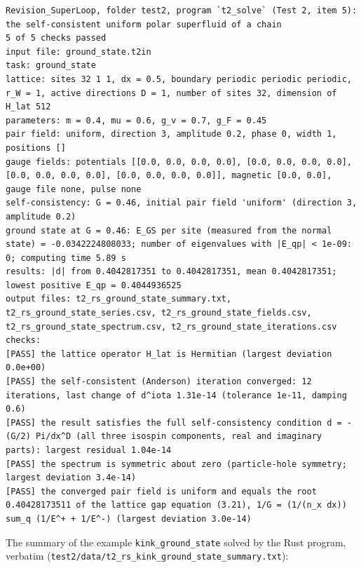 \documentclass[
  10pt,
]{article}
\begin{document}
\begin{verbatim}
Revision_SuperLoop, folder test2, program `t2_solve` (Test 2, item 5): the self-consistent uniform polar superfluid of a chain
5 of 5 checks passed
input file: ground_state.t2in
task: ground_state
lattice: sites 32 1 1, dx = 0.5, boundary periodic periodic periodic, r_W = 1, active directions D = 1, number of sites 32, dimension of H_lat 512
parameters: m = 0.4, mu = 0.6, g_v = 0.7, g_F = 0.45
pair field: uniform, direction 3, amplitude 0.2, phase 0, width 1, positions []
gauge fields: potentials [[0.0, 0.0, 0.0, 0.0], [0.0, 0.0, 0.0, 0.0], [0.0, 0.0, 0.0, 0.0], [0.0, 0.0, 0.0, 0.0]], magnetic [0.0, 0.0], gauge file none, pulse none
self-consistency: G = 0.46, initial pair field 'uniform' (direction 3, amplitude 0.2)
ground state at G = 0.46: E_GS per site (measured from the normal state) = -0.0342224808033; number of eigenvalues with |E_qp| < 1e-09: 0; computing time 5.89 s
results: |d| from 0.4042817351 to 0.4042817351, mean 0.4042817351; lowest positive E_qp = 0.4044936525
output files: t2_rs_ground_state_summary.txt, t2_rs_ground_state_series.csv, t2_rs_ground_state_fields.csv, t2_rs_ground_state_spectrum.csv, t2_rs_ground_state_iterations.csv
checks:
[PASS] the lattice operator H_lat is Hermitian (largest deviation 0.0e+00)
[PASS] the self-consistent (Anderson) iteration converged: 12 iterations, last change of d^iota 1.31e-14 (tolerance 1e-11, damping 0.6)
[PASS] the result satisfies the full self-consistency condition d = -(G/2) Pi/dx^D (all three isospin components, real and imaginary parts): largest residual 1.04e-14
[PASS] the spectrum is symmetric about zero (particle-hole symmetry; largest deviation 3.4e-14)
[PASS] the converged pair field is uniform and equals the root 0.40428173511 of the lattice gap equation (3.21), 1/G = (1/(n_x dx)) sum_q (1/E^+ + 1/E^-) (largest deviation 3.0e-14)
\end{verbatim}

The summary of the example \texttt{kink\_ground\_state} solved by the
Rust program, verbatim
(\texttt{test2/data/t2\_rs\_kink\_ground\_state\_summary.txt}):
\end{document}
